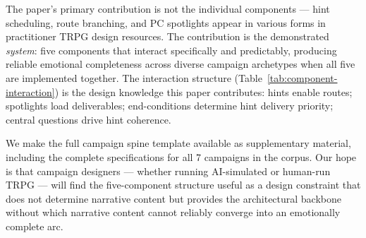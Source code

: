The paper's primary contribution is not the individual components --- hint
scheduling, route branching, and PC spotlights appear in various forms in
practitioner TRPG design resources. The contribution is the demonstrated
\textit{system}: five components that interact specifically and predictably,
producing reliable emotional completeness across diverse campaign archetypes
when all five are implemented together. The interaction structure
(Table~\ref{tab:component-interaction}) is the design knowledge this paper
contributes: hints enable routes; spotlights load deliverables; end-conditions
determine hint delivery priority; central questions drive hint coherence.

We make the full campaign spine template available as supplementary material,
including the complete specifications for all 7 campaigns in the corpus. Our
hope is that campaign designers --- whether running AI-simulated or human-run
TRPG --- will find the five-component structure useful as a design constraint
that does not determine narrative content but provides the architectural
backbone without which narrative content cannot reliably converge into an
emotionally complete arc.
